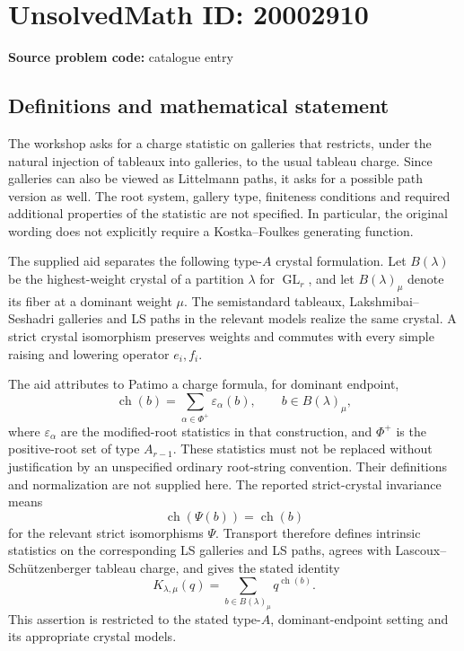 \documentclass[11pt]{article}
\newcommand{\eps}{\varepsilon}
\begin{document}
\section*{UnsolvedMath ID: 20002910}
\textbf{Source problem code:} catalogue entry
\subsection{Definitions and mathematical statement}
The workshop asks for a charge statistic on galleries that restricts, under the natural injection of tableaux into galleries, to the usual tableau charge. Since galleries can also be viewed as Littelmann paths, it asks for a possible path version as well. The root system, gallery type, finiteness conditions and required additional properties of the statistic are not specified. In particular, the original wording does not explicitly require a Kostka--Foulkes generating function.

The supplied aid separates the following type-$A$ crystal formulation. Let $B(\lambda)$ be the highest-weight crystal of a partition $\lambda$ for $\operatorname{GL}_r$, and let $B(\lambda)_\mu$ denote its fiber at a dominant weight $\mu$. The semistandard tableaux, Lakshmibai--Seshadri galleries and LS paths in the relevant models realize the same crystal. A strict crystal isomorphism preserves weights and commutes with every simple raising and lowering operator $e_i,f_i$.

The aid attributes to Patimo a charge formula, for dominant endpoint,
\[
\operatorname{ch}(b)=\sum_{\alpha\in\Phi^+}\eps_\alpha(b),\qquad b\in B(\lambda)_\mu,
\]
where $\eps_\alpha$ are the modified-root statistics in that construction, and $\Phi^+$ is the positive-root set of type $A_{r-1}$. These statistics must not be replaced without justification by an unspecified ordinary root-string convention. Their definitions and normalization are not supplied here. The reported strict-crystal invariance means
\[
\operatorname{ch}(\Psi(b))=\operatorname{ch}(b)
\]
for the relevant strict isomorphisms $\Psi$. Transport therefore defines intrinsic statistics on the corresponding LS galleries and LS paths, agrees with Lascoux--Sch\"utzenberger tableau charge, and gives the stated identity
\[
K_{\lambda,\mu}(q)=\sum_{b\in B(\lambda)_\mu}q^{\operatorname{ch}(b)}.
\]
This assertion is restricted to the stated type-$A$, dominant-endpoint setting and its appropriate crystal models.
\end{document}
